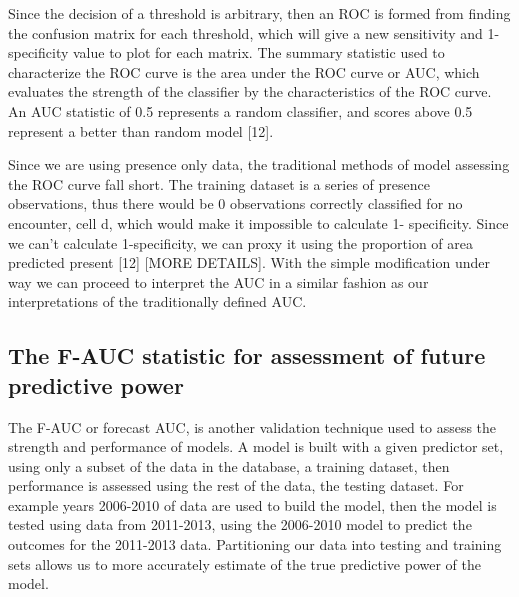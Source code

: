 \noindent Since the decision of a threshold is arbitrary, then an ROC is formed from finding the confusion matrix for each threshold, which will give a new sensitivity and 1-specificity value to plot for each matrix. The summary statistic used to characterize the ROC curve is the area under the ROC curve or AUC, which evaluates the strength of the classifier by the characteristics of the ROC curve. An AUC statistic of 0.5 represents a random classifier, and scores above 0.5 represent a better than random model [12].    \newline

\noindent Since we are using presence only data, the traditional methods of model assessing the ROC curve fall short. The training dataset is a series of presence observations, thus there would be 0 observations correctly classified for no encounter, cell d,  which would make it impossible to calculate 1- specificity. Since we can't calculate 1-specificity, we can proxy it using the proportion of area predicted present [12] [MORE DETAILS].  With the simple modification under way we can proceed to interpret the AUC in a similar fashion as our interpretations of the traditionally defined AUC.  \newline


\subsection{The F-AUC statistic for assessment of future predictive power }

The F-AUC or forecast AUC, is another validation technique used to assess the strength and performance of models. A model is built with a given predictor set, using only a subset of the data in the database, a training dataset, then performance is assessed using the rest of the data, the testing dataset. For example years 2006-2010 of data are used to build the model, then the model is tested using data from 2011-2013, using the 2006-2010 model to predict the outcomes for the 2011-2013 data. Partitioning our data into testing and training sets allows us to more accurately estimate of the true predictive power of the model. 

